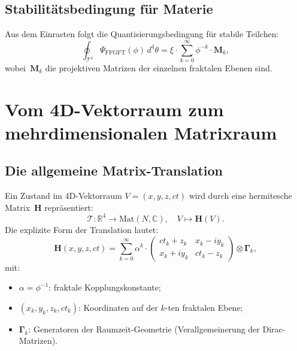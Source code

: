 \subsection{Stabilitätsbedingung für Materie}

Aus dem Einrasten folgt die Quantisierungsbedingung für stabile Teilchen:
\begin{equation}
  \oint_{\mathcal{T}^4}
    \Psi_{\text{FFGFT}}(\phi)\,d^4\theta
  = \xi \cdot \sum_{k=0}^{\infty} \phi^{-k} \cdot \mathbf{M}_k,
\end{equation}
wobei~$\mathbf{M}_k$ die projektiven Matrizen der einzelnen fraktalen
Ebenen sind.

\section{Vom 4D-Vektorraum zum mehrdimensionalen Matrixraum}

\subsection{Die allgemeine Matrix-Translation}

Ein Zustand im 4D-Vektorraum $V = (x,y,z,ct)$ wird durch eine hermitesche
Matrix~$\mathbf{H}$ repräsentiert:
\begin{equation}
  \mathcal{T}: \mathbb{R}^4 \to \mathrm{Mat}(N,\mathbb{C}),\quad
  V \mapsto \mathbf{H}(V).
\end{equation}
Die explizite Form der Translation lautet:
\begin{equation}
  \mathbf{H}(x,y,z,ct)
  = \sum_{k=0}^{\infty} \alpha^k \cdot
    \begin{pmatrix}
      ct_k + z_k   & x_k - iy_k \\
      x_k + iy_k   & ct_k - z_k
    \end{pmatrix}
    \otimes \mathbf{\Gamma}_k,
\end{equation}
mit:
\begin{itemize}
  \item $\alpha = \phi^{-1}$: fraktale Kopplungskonstante;
  \item $(x_k, y_k, z_k, ct_k)$: Koordinaten auf der $k$-ten fraktalen Ebene;
  \item $\mathbf{\Gamma}_k$: Generatoren der Raumzeit-Geometrie
        (Verallgemeinerung der Dirac-Matrizen).
\end{itemize}

